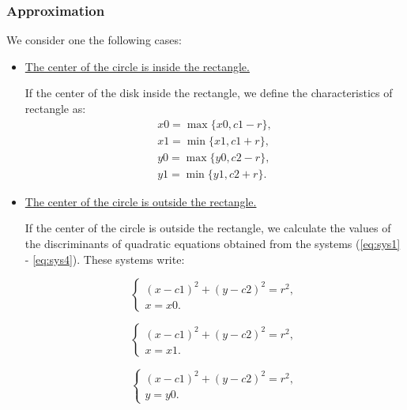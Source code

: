 \documentclass{report}
\begin{document}
	\subsubsection*{Approximation}
	
	We consider one the following cases:
	\begin{itemize}
		\item \underline{The center of the circle is inside the rectangle.}
				
		 If the center of the disk inside the rectangle, we define the characteristics of rectangle as:
		\begin{equation}
			\begin{gathered}
				x0 = \max\{x0, c1-r\},\\
				x1 = \min\{x1, c1+r\},\\
				y0 = \max\{y0, c2-r\},\\
				y1 = \min\{y1, c2+r\}.
			\end{gathered}
		\end{equation}
	
		\item \underline{The center of the circle is outside the rectangle.}
		
		 If the center of the circle is outside the rectangle, we calculate the values of the discriminants of quadratic equations obtained from the systems (\ref{eq:sys1} - \ref{eq:sys4}). These systems write: 
	
		\begin{equation}
			\begin{cases}
			(x - c1)^2 + (y - c2)^2 = r^2,\\ 
			x = x0.
			\end{cases}
		\label{eq:sys1}
		\end{equation}
	
		\begin{equation}
			\begin{cases}
				(x - c1)^2 + (y - c2)^2 = r^2,\\ 
				x = x1.
			\end{cases}
		\label{eq:sys2}
		\end{equation}
	
		\begin{equation}
			\begin{cases}
				(x - c1)^2 + (y - c2)^2 = r^2,\\ 
				y = y0.			
			\end{cases}
		\label{eq:sys3}
		\end{equation}
	

\end{itemize}
\end{document}
